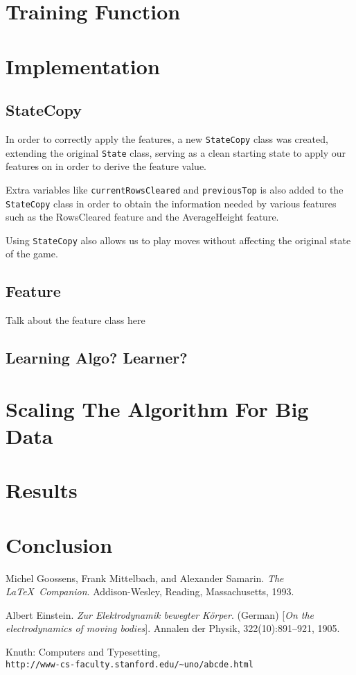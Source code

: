 \documentclass[12pt]{article}
\begin{document}
\section{Training Function}

\section{Implementation}
\subsection{StateCopy}
In order to correctly apply the features, a new \texttt{StateCopy} class was created, extending the original \texttt{State} class, serving as a clean starting state to apply our features on in order to derive the feature value.

Extra variables like \texttt{currentRowsCleared} and \texttt{previousTop} is also added to the \texttt{StateCopy} class in order to obtain the information needed by various features such as the RowsCleared feature and the AverageHeight feature.

Using \texttt{StateCopy} also allows us to play moves without affecting the original state of the game.

\subsection{Feature}
Talk about the feature class here

\subsection{Learning Algo? Learner?}

\section{Scaling The Algorithm For Big Data}

\section{Results}

\section{Conclusion}



\begin{thebibliography}{12}
Michel Goossens, Frank Mittelbach, and Alexander Samarin. 
\textit{The \LaTeX\ Companion}. 
Addison-Wesley, Reading, Massachusetts, 1993.
 
Albert Einstein. 
\textit{Zur Elektrodynamik bewegter K{\"o}rper}. (German) 
[\textit{On the electrodynamics of moving bodies}]. 
Annalen der Physik, 322(10):891–921, 1905.
 
Knuth: Computers and Typesetting,
\\\texttt{http://www-cs-faculty.stanford.edu/\~{}uno/abcde.html}
\end{thebibliography}
\end{document}
